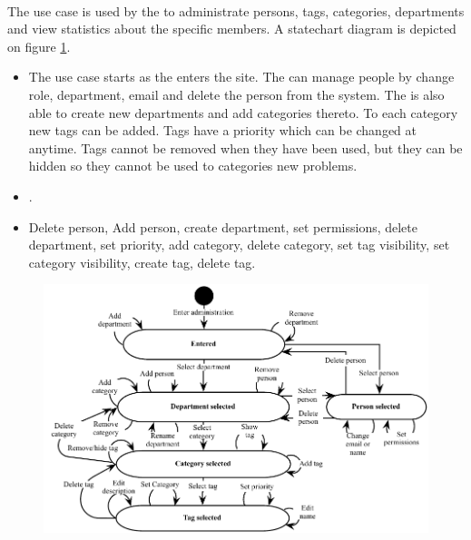 \paragraph{\tucadmin[c]} The use case \tucadmin[] is used by the \sadmin[] to administrate persons, tags, categories, departments and view statistics about the specific \astaff members. A statechart diagram is depicted on figure \ref{fig:use_case_diagram}.

\begin{itemize}
\item{} The use case starts as the \sadmin{} enters the site. The \admin[] can manage people by change role, department, email and delete the person from the system. The \admin[] is also able to create new  departments and add categories thereto. To each category new tags can be added. Tags have a priority which can be changed at anytime. Tags cannot be removed when they have been used, but they can be hidden so they cannot be used to categories new problems.  

\item{} . 

\item{} Delete person, Add person, create department, set permissions, delete department, set priority, add category, delete category, set tag visibility, set category visibility, create tag, delete tag. 
\end{itemize}


\begin{figure}[htbp]
\begin{center}
 \includegraphics[scale=0.8]{input/application_domain_analysis/admin_use_case}
\label{fig:use_case_diagram}
\end{center}
\end{figure}